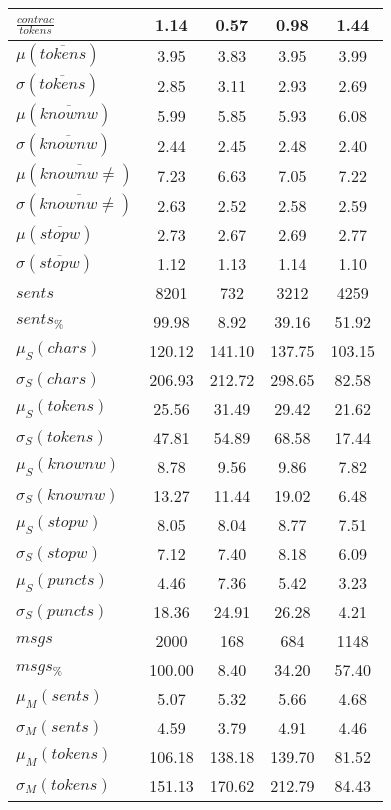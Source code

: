\begin{table}[h!]
\begin{center}
\begin{tabular}{| l || c | c | c | c |}
$\frac{contrac}{tokens}$ & 1.14  & 0.57  & 0.98  & 1.44 \\\hline\hline
$\mu(\overline{tokens})$ & 3.95  & 3.83  & 3.95  & 3.99 \\
$\sigma(\overline{tokens})$ & 2.85  & 3.11  & 2.93  & 2.69 \\\hline
$\mu(\overline{knownw})$ & 5.99  & 5.85  & 5.93  & 6.08 \\
$\sigma(\overline{knownw})$ & 2.44  & 2.45  & 2.48  & 2.40 \\\hline
$\mu(\overline{knownw \neq})$ & 7.23  & 6.63  & 7.05  & 7.22 \\
$\sigma(\overline{knownw \neq})$ & 2.63  & 2.52  & 2.58  & 2.59 \\\hline
$\mu(\overline{stopw})$ & 2.73  & 2.67  & 2.69  & 2.77 \\
$\sigma(\overline{stopw})$ & 1.12  & 1.13  & 1.14  & 1.10 \\\hline\hline
$sents$ & 8201  & 732  & 3212  & 4259 \\
$sents_{\%}$ & 99.98  & 8.92  & 39.16  & 51.92 \\\hline
$\mu_S(chars)$ & 120.12  & 141.10  & 137.75  & 103.15 \\
$\sigma_S(chars)$ & 206.93  & 212.72  & 298.65  & 82.58 \\\hline
$\mu_S(tokens)$ & 25.56  & 31.49  & 29.42  & 21.62 \\
$\sigma_S(tokens)$ & 47.81  & 54.89  & 68.58  & 17.44 \\\hline
$\mu_S(knownw)$ & 8.78  & 9.56  & 9.86  & 7.82 \\
$\sigma_S(knownw)$ & 13.27  & 11.44  & 19.02  & 6.48 \\\hline
$\mu_S(stopw)$ & 8.05  & 8.04  & 8.77  & 7.51 \\
$\sigma_S(stopw)$ & 7.12  & 7.40  & 8.18  & 6.09 \\\hline
$\mu_S(puncts)$ & 4.46  & 7.36  & 5.42  & 3.23 \\
$\sigma_S(puncts)$ & 18.36  & 24.91  & 26.28  & 4.21 \\\hline\hline
$msgs$ & 2000  & 168  & 684  & 1148 \\
$msgs_{\%}$ & 100.00  & 8.40  & 34.20  & 57.40 \\\hline
$\mu_M(sents)$ & 5.07  & 5.32  & 5.66  & 4.68 \\
$\sigma_M(sents)$ & 4.59  & 3.79  & 4.91  & 4.46 \\\hline
$\mu_M(tokens)$ & 106.18  & 138.18  & 139.70  & 81.52 \\
$\sigma_M(tokens)$ & 151.13  & 170.62  & 212.79  & 84.43 \\\hline

\end{tabular}
\end{center}
\end{table}
